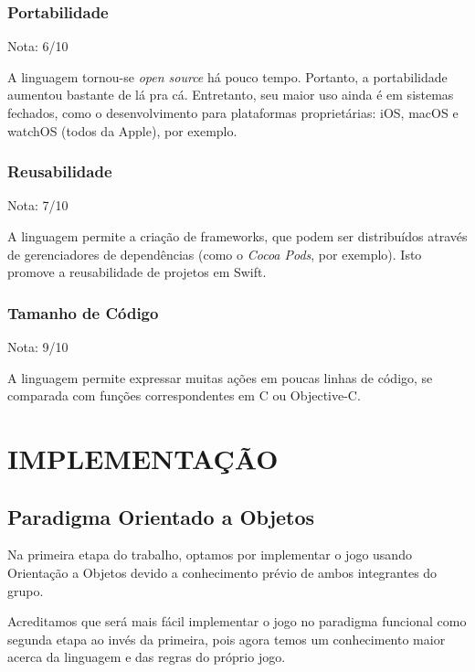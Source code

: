 \documentclass[rel_mlp]{iiufrgs}
\begin{document}
\subsection{Portabilidade}

Nota: 6/10

A linguagem tornou-se \textit{open source} há pouco tempo. Portanto, a portabilidade aumentou bastante de lá pra cá. Entretanto, seu maior uso ainda é em sistemas fechados, como o desenvolvimento para plataformas proprietárias: iOS, macOS e watchOS (todos da Apple), por exemplo.

\subsection{Reusabilidade}

Nota: 7/10

A linguagem permite a criação de frameworks, que podem ser distribuídos através de gerenciadores de dependências (como o \textit{Cocoa Pods}, por exemplo). Isto promove a reusabilidade de projetos em Swift.

\subsection{Tamanho de Código}

Nota: 9/10

A linguagem permite expressar muitas ações em poucas linhas de código, se comparada com funções correspondentes em C ou Objective-C.




\chapter{IMPLEMENTAÇÃO} \label{intro}

\section{Paradigma Orientado a Objetos} \label{intro}

Na primeira etapa do trabalho, optamos por implementar o jogo usando Orientação a Objetos devido a conhecimento prévio de ambos integrantes do grupo.

Acreditamos que será mais fácil implementar o jogo no paradigma funcional como segunda etapa ao invés da primeira, pois agora temos um conhecimento maior acerca da linguagem e das regras do próprio jogo.
\end{document}
